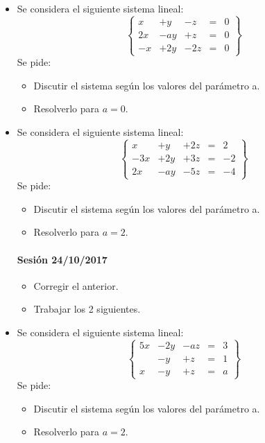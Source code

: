 \documentclass[palatino,nosec]{Docencia}
\begin{document}
\begin{itemize}

\item Se considera el siguiente sistema lineal: \[
\left\{\begin{array}{ccccc}
x&+y&-z&=&0\\
2x&-ay&+z&=&0\\
-x&+2y&-2z&=&0
\end{array}\right\}
\]
Se pide:
\begin{itemize}
	\item Discutir el sistema según los valores del parámetro a.
	\item Resolverlo para $a=0$.
\end{itemize}


\item Se considera el siguiente sistema lineal:\[
\left\{\begin{array}{ccccc}
x&+y&+2z&=&2\\
-3x&+2y&+3z&=&-2\\
2x&-ay&-5z&=&-4
\end{array}\right\}
\]
Se pide:
\begin{itemize}
	\item Discutir el sistema según los valores del parámetro a.
	\item Resolverlo para $a=2$.
\end{itemize}


\paragraph{Sesión 24/10/2017}
\begin{itemize}
	\item Corregir el anterior.
	\item Trabajar los 2 siguientes.
\end{itemize}


\item Se considera el siguiente sistema lineal:\[
\left\{\begin{array}{ccccc}
5x&-2y&-az&=&3\\
&-y&+z&=&1\\
x&-y&+z&=&a
\end{array}\right\}
\]
Se pide:
\begin{itemize}
	\item Discutir el sistema según los valores del parámetro a.
	\item Resolverlo para $a=2$.
\end{itemize}


\end{itemize}
\end{document}
